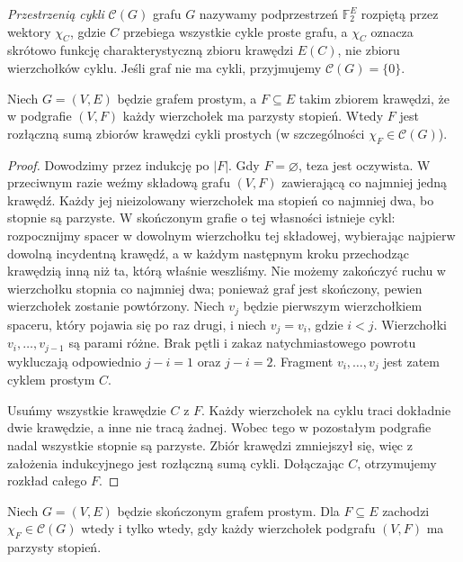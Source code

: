 \begin{definicja}
\emph{Przestrzenią cykli} $\mathcal C(G)$ grafu
$G$ nazywamy podprzestrzeń $\mathbb F_2^E$
rozpiętą przez wektory $\chi_C$,
gdzie $C$ przebiega wszystkie cykle proste grafu,
a $\chi_C$ oznacza skrótowo funkcję charakterystyczną
zbioru krawędzi $E(C)$, nie zbioru wierzchołków cyklu.
Jeśli graf nie ma cykli, przyjmujemy
$\mathcal C(G)=\{0\}$.
\end{definicja}

\begin{lemat}
Niech $G=(V,E)$ będzie grafem prostym,
a $F\subseteq E$ takim zbiorem krawędzi,
że w podgrafie $(V,F)$ każdy wierzchołek ma
parzysty stopień. Wtedy $F$ jest rozłączną
sumą zbiorów krawędzi cykli prostych
(w szczególności $\chi_F\in\mathcal C(G)$).
\end{lemat}

\begin{proof}
Dowodzimy przez indukcję po $|F|$. Gdy $F=\varnothing$,
teza jest oczywista. W przeciwnym razie
weźmy składową grafu $(V,F)$ zawierającą
co najmniej jedną krawędź. Każdy jej
nieizolowany wierzchołek ma stopień co najmniej
dwa, bo stopnie są parzyste. W skończonym
grafie o tej własności istnieje cykl:
rozpocznijmy spacer w dowolnym wierzchołku tej
składowej, wybierając najpierw dowolną incydentną
krawędź, a w każdym następnym kroku przechodząc
krawędzią inną niż ta, którą właśnie weszliśmy.
Nie możemy zakończyć ruchu w wierzchołku
stopnia co najmniej dwa; ponieważ graf jest
skończony, pewien wierzchołek zostanie
powtórzony. Niech $v_j$ będzie pierwszym wierzchołkiem spaceru,
który pojawia się po raz drugi, i niech $v_j=v_i$,
gdzie $i<j$. Wierzchołki $v_i,\ldots,v_{j-1}$ są
parami różne. Brak pętli i zakaz natychmiastowego
powrotu wykluczają odpowiednio $j-i=1$ oraz $j-i=2$.
Fragment $v_i,\ldots,v_j$ jest zatem cyklem prostym $C$.

Usuńmy wszystkie krawędzie $C$ z $F$.
Każdy wierzchołek na cyklu traci dokładnie
dwie krawędzie, a inne nie tracą żadnej.
Wobec tego w pozostałym podgrafie nadal
wszystkie stopnie są parzyste. Zbiór
krawędzi zmniejszył się, więc z założenia
indukcyjnego jest rozłączną sumą cykli.
Dołączając $C$, otrzymujemy rozkład całego $F$.
\end{proof}

\begin{wniosek}
\label{cor:tg-przestrzen-cykli-parzystosc}
Niech $G=(V,E)$ będzie skończonym grafem prostym.
Dla $F\subseteq E$ zachodzi $\chi_F\in\mathcal C(G)$
wtedy i tylko wtedy, gdy każdy wierzchołek podgrafu
$(V,F)$ ma parzysty stopień.
\end{wniosek}

